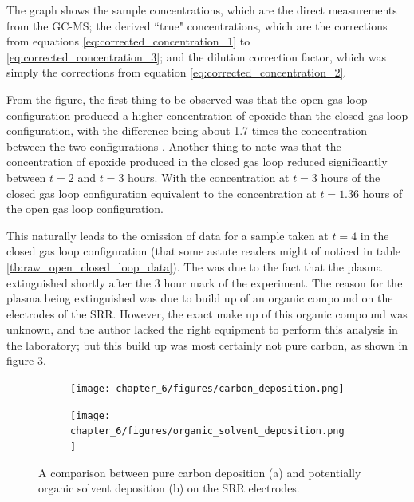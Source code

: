 The graph shows the sample concentrations, which are the direct measurements from the GC-MS; the derived ``true" concentrations, which are the corrections from equations \ref{eq:corrected_concentration_1} to \ref{eq:corrected_concentration_3}; and the dilution correction factor, which was simply the corrections from equation \ref{eq:corrected_concentration_2}.

From the figure, the first thing to be observed was that the open gas loop configuration produced a higher concentration of epoxide than the closed gas loop configuration, with the difference being about 1.7 times the concentration between the two configurations . Another thing to note was that the concentration of epoxide produced in the closed gas loop reduced significantly between $t=2$ and $t=3$ hours. With the concentration at $t=3$ hours of the closed gas loop configuration equivalent to the concentration at $t=1.36$ hours of the open gas loop configuration.

This naturally leads to the omission of data for a sample taken at $t=4$ in the closed gas loop configuration (that some astute readers might of noticed in table \ref{tb:raw_open_closed_loop_data}). The was due to the fact that the plasma extinguished shortly after the 3 hour mark of the experiment. The reason for the plasma being extinguished was due to build up of an organic compound on the electrodes of the SRR. However, the exact make up of this organic compound was unknown, and the author lacked the right equipment to perform this analysis in the laboratory; but this build up was most certainly not pure carbon, as shown in figure \ref{fig:deposition_comparison}.

\begin{figure}
    \centering
    \begin{subfigure}[b]{\textwidth}
        \centering
        \texttt{[image: chapter\_6/figures/carbon\_deposition.png]}
        \caption{}
        \label{fig:carbon_deposition}
    \end{subfigure}
    \vfill
    \begin{subfigure}[b]{\textwidth}  
        \centering 
        \texttt{[image: chapter\_6/figures/organic\_solvent\_deposition.png]}
        \caption{}
        \label{fig:organic_solvent_deposition}
    \end{subfigure}
    \caption{\small A comparison between pure carbon deposition (a) and potentially organic solvent deposition  (b) on the SRR electrodes.} 
    \label{fig:deposition_comparison}
\end{figure}


